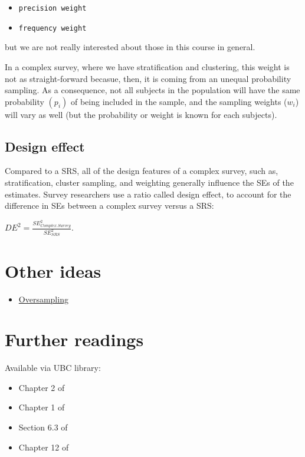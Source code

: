\documentclass[
]{book}
\providecommand{\tightlist}{%
  \setlength{\itemsep}{0pt}\setlength{\parskip}{0pt}}
\begin{document}
\begin{itemize}
\tightlist
\item
  \texttt{precision\ weight}
\item
  \texttt{frequency\ weight}
\end{itemize}

but we are not really interested about those in this course in general.

In a complex survey, where we have stratification and clustering, this weight is not as straight-forward becasue, then, it is coming from an unequal probability sampling. As a consequence, not all subjects in the population will have the same probability \((p_i)\) of being included in the sample, and the sampling weights (\(w_i\)) will vary as well (but the probability or weight is known for each subjects).

\hypertarget{design-effect}{%
\subsection{Design effect}\label{design-effect}}

Compared to a SRS, all of the design features of a complex survey, such as, stratification, cluster sampling, and weighting generally influence the SEs of the estimates. Survey researchers use a ratio called design effect, to account for the difference in SEs between a complex survey versus a SRS:

\(DE^2 = \frac{SE^2_{Complex.Survey}}{SE^2_{SRS}}\).

\hypertarget{other-ideas}{%
\section{Other ideas}\label{other-ideas}}

\begin{itemize}
\tightlist
\item
  \href{https://wwwn.cdc.gov/nchs/nhanes/tutorials/module2.aspx}{Oversampling}
\end{itemize}

\hypertarget{further-readings}{%
\section{Further readings}\label{further-readings}}

Available via UBC library:

\begin{itemize}
\tightlist
\item
  Chapter 2 of \citet{heeringa2017applied}
\item
  Chapter 1 of \citet{lumley2011complex}
\item
  Section 6.3 of \citet{bilder2014analysis}
\item
  Chapter 12 of \citet{vittinghoff2011regression}
\end{itemize}
\end{document}
